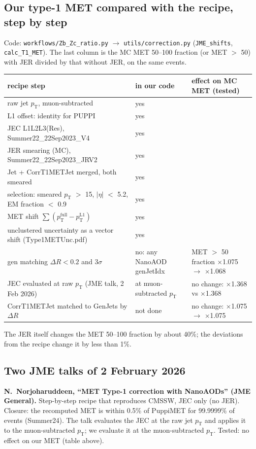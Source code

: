 \documentclass[11pt,a4paper]{article}
\newcommand{\pt}{$p_\mathrm{T}$}
\newcommand{\aeta}{$|\eta|$}
\begin{document}
\subsection{Our type-1 MET compared with the recipe, step by step}
Code: \texttt{workflows/Zb\_Zc\_ratio.py} $\to$ \texttt{utils/correction.py} (\texttt{JME\_shifts}, \texttt{calc\_T1\_MET}).
The last column is the MC MET 50--100 fraction (or MET $>$ 50) with JER divided by that without JER, on the same events.
\begin{center}
\small
\begin{tabular}{p{7.4cm} p{3.0cm} p{4.4cm}}
\toprule
recipe step & in our code & effect on MC MET (tested) \\
\midrule
raw jet \pt, muon-subtracted & yes & \\
L1 offset: identity for PUPPI & yes & \\
JEC L1L2L3(Res), Summer22\_22Sep2023\_V4 & yes & \\
JER smearing (MC), Summer22\_22Sep2023\_JRV2 & yes & \\
Jet + CorrT1METJet merged, both smeared & yes & \\
selection: smeared \pt{} $>$ 15, \aeta{} $<$ 5.2, EM fraction $<$ 0.9 & yes & \\
MET shift $\sum(p_\mathrm{T}^\mathrm{full}-p_\mathrm{T}^\mathrm{L1})$ & yes & \\
unclustered uncertainty as a vector shift (Type1METUnc.pdf) & yes & \\
\midrule
gen matching $\Delta R<0.2$ and $3\sigma$ & no: any NanoAOD genJetIdx & MET $>$ 50 fraction $\times$1.075 $\to$ $\times$1.068 \\
JEC evaluated at raw \pt{} (JME talk, 2 Feb 2026) & at muon-subtracted \pt & no change: $\times$1.368 vs $\times$1.368 \\
CorrT1METJet matched to GenJets by $\Delta R$ & not done & no change: $\times$1.075 $\to$ $\times$1.075 \\
\bottomrule
\end{tabular}
\end{center}
The JER itself changes the MET 50--100 fraction by about 40\%; the deviations from the recipe change it by less than 1\%.

\subsection{Two JME talks of 2 February 2026}
\textbf{N.~Norjoharuddeen, ``MET Type-1 correction with NanoAODs'' (JME General).} Step-by-step recipe that reproduces CMSSW,
JEC only (no JER). Closure: the recomputed MET is within 0.5\% of PuppiMET for 99.9999\% of events (Summer24). The talk evaluates
the JEC at the raw jet \pt{} and applies it to the muon-subtracted \pt; we evaluate it at the muon-subtracted \pt. Tested: no
effect on our MET (table above).
\end{document}
